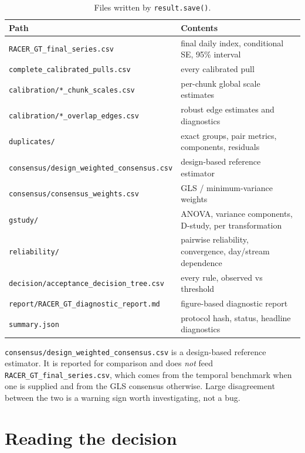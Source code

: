 \documentclass[12pt,a4paper,oneside]{article}
\begin{document}
\begin{table}[H]
\centering\small
\caption{Files written by \texttt{result.save()}.}
\begin{tabularx}{\textwidth}{lX}
\toprule
Path & Contents\\
\midrule
\texttt{RACER\_GT\_final\_series.csv} & final daily index, conditional SE, 95\% interval\\
\texttt{complete\_calibrated\_pulls.csv} & every calibrated pull\\
\texttt{calibration/*\_chunk\_scales.csv} & per-chunk global scale estimates\\
\texttt{calibration/*\_overlap\_edges.csv} & robust edge estimates and diagnostics\\
\texttt{duplicates/} & exact groups, pair metrics, components, residuals\\
\texttt{consensus/design\_weighted\_consensus.csv} & design-based reference estimator\\
\texttt{consensus/consensus\_weights.csv} & GLS / minimum-variance weights\\
\texttt{gstudy/} & ANOVA, variance components, D-study, per transformation\\
\texttt{reliability/} & pairwise reliability, convergence, day/stream dependence\\
\texttt{decision/acceptance\_decision\_tree.csv} & every rule, observed vs threshold\\
\texttt{report/RACER\_GT\_diagnostic\_report.md} & figure-based diagnostic report\\
\texttt{summary.json} & protocol hash, status, headline diagnostics\\
\bottomrule
\end{tabularx}
\end{table}

\begin{remark}
\texttt{consensus/design\_weighted\_consensus.csv} is a design-based reference
estimator. It is reported for comparison and does \emph{not} feed
\texttt{RACER\_GT\_final\_series.csv}, which comes from the temporal benchmark
when one is supplied and from the GLS consensus otherwise. Large disagreement
between the two is a warning sign worth investigating, not a bug.
\end{remark}

\section{Reading the decision}
\end{document}
